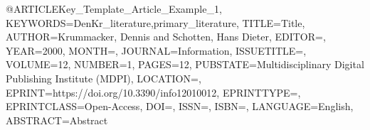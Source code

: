 @ARTICLE{Key_Template_Article_Example_1,
    KEYWORDS={DenKr_literature,primary_literature},
    TITLE={\begingroup
        {Title}\endgroup},
    AUTHOR={Krummacker, Dennis and Schotten, Hans Dieter},
    EDITOR={},
    YEAR={2000},
    MONTH={},
    JOURNAL={Information},
    ISSUETITLE={},
    VOLUME={12},
    NUMBER={1},
    PAGES={12},
    PUBSTATE={Multidisciplinary Digital Publishing Institute (MDPI)},
    LOCATION={},
    EPRINT={https://doi.org/10.3390/info12010012},
    EPRINTTYPE={},
    EPRINTCLASS={Open-Access},
    DOI={},
    ISSN={},
    ISBN={},
    LANGUAGE={English},
    ABSTRACT={\begingroup
        {Abstract}\endgroup}
}